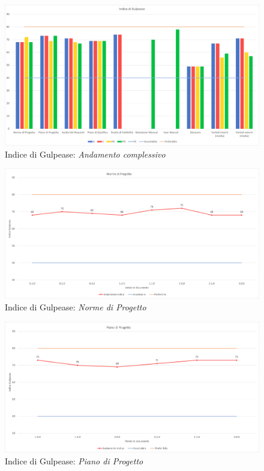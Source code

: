 \begin{figure}[!ht]
    \caption{Indice di Gulpease: \textit{Andamento complessivo}}
    \vspace{10px}
    \includegraphics[scale=0.5]{sezioni/immagini/GulpeaseGenerale.png}
    \centering
\end{figure}
\begin{figure}[!ht]
    \caption{Indice di Gulpease: \textit{Norme di Progetto}}
    \vspace{10px}
    \includegraphics[scale=0.5]{sezioni/immagini/NormeGulpease.png}
    \centering
\end{figure}
\pagebreak
\begin{figure}[!ht]
    \caption{Indice di Gulpease: \textit{Piano di Progetto}}
    \vspace{10px}
    \includegraphics[scale=0.5]{sezioni/immagini/PianoProgettoGulpease.png}
    \centering
\end{figure}

